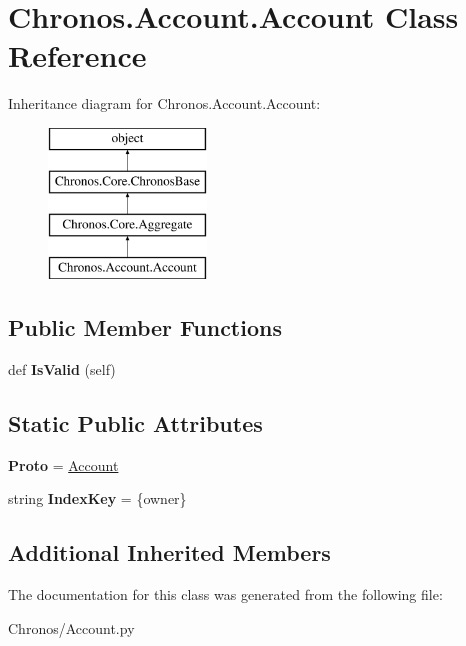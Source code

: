 \hypertarget{classChronos_1_1Account_1_1Account}{}\section{Chronos.\+Account.\+Account Class Reference}
\label{classChronos_1_1Account_1_1Account}
Inheritance diagram for Chronos.\+Account.\+Account\+:\begin{figure}[H]
\begin{center}
\leavevmode
\includegraphics[height=4.000000cm]{classChronos_1_1Account_1_1Account}
\end{center}
\end{figure}
\subsection*{Public Member Functions}
\begin{DoxyCompactItemize}
\item 
def {\bfseries Is\+Valid} (self)\hypertarget{classChronos_1_1Account_1_1Account_a98e3d24098949e54f7b0abda843e6423}{}\label{classChronos_1_1Account_1_1Account_a98e3d24098949e54f7b0abda843e6423}

\end{DoxyCompactItemize}
\subsection*{Static Public Attributes}
\begin{DoxyCompactItemize}
\item 
{\bfseries Proto} = \hyperlink{classChronos_1_1Account_1_1Account}{Account}\hypertarget{classChronos_1_1Account_1_1Account_a522a6a80da72eabdd5cb25b4a3836277}{}\label{classChronos_1_1Account_1_1Account_a522a6a80da72eabdd5cb25b4a3836277}

\item 
string {\bfseries Index\+Key} = \textquotesingle{}\{owner\}\textquotesingle{}\hypertarget{classChronos_1_1Account_1_1Account_ab62a2993fac978c0755f74ca99ce026b}{}\label{classChronos_1_1Account_1_1Account_ab62a2993fac978c0755f74ca99ce026b}

\end{DoxyCompactItemize}
\subsection*{Additional Inherited Members}


The documentation for this class was generated from the following file\+:\begin{DoxyCompactItemize}
\item 
Chronos/Account.\+py\end{DoxyCompactItemize}
